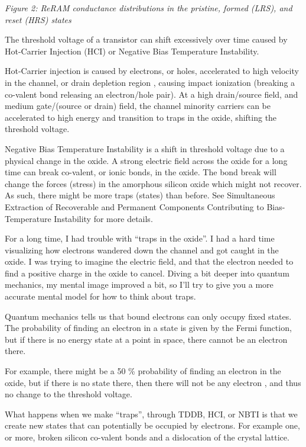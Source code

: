{
\centering
{}
}

\emph{Figure 2: ReRAM conductance distributions in the pristine, formed
(LRS), and reset (HRS) states}

The threshold voltage of a transistor can shift excessively over time
caused by Hot-Carrier Injection (HCI) or Negative Bias Temperature
Instability.

Hot-Carrier injection is caused by electrons, or holes, accelerated to
high velocity in the channel, or drain depletion region , causing impact
ionization (breaking a co-valent bond releasing an electron/hole pair).
At a high drain/source field, and\\
medium gate/(source or drain) field, the channel minority carriers can
be accelerated to high energy and transition to traps in the oxide,
shifting the threshold voltage.

Negative Bias Temperature Instability is a shift in threshold voltage
due to a physical change in the oxide. A strong electric field across
the oxide for a long time can break co-valent, or ionic bonds, in the
oxide. The bond break will change the forces (stress) in the amorphous
silicon oxide which might not recover. As such, there might be more
traps (states) than before. See Simultaneous Extraction of Recoverable
and Permanent Components Contributing to Bias-Temperature Instability
 for more details.

For a long time, I had trouble with ``traps in the oxide''. I had a hard
time visualizing how electrons wandered down the channel and got caught
in the oxide. I was trying to imagine the electric field, and that the
electron needed to find a positive charge in the oxide to cancel. Diving
a bit deeper into quantum mechanics, my mental image improved a bit, so
I'll try to give you a more accurate mental model for how to think about
traps.

Quantum mechanics tells us that bound electrons can only occupy fixed
states. The probability of finding an electron in a state is given by
the Fermi function, but if there is no energy state at a point in space,
there cannot be an electron there.

For example, there might be a 50 \% probability of finding an electron
in the oxide, but if there is no state there, then there will not be any
electron , and thus no change to the threshold voltage.

What happens when we make ``traps'', through TDDB, HCI, or NBTI is that
we create new states that can potentially be occupied by electrons. For
example one, or more, broken silicon co-valent bonds and a dislocation
of the crystal lattice.

